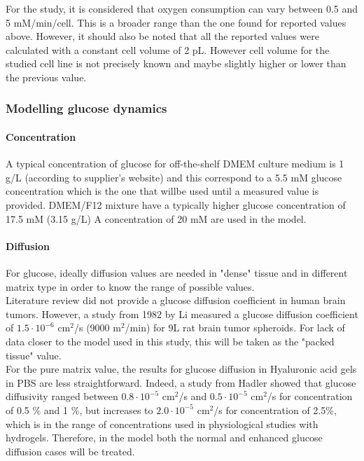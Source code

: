 \documentclass[11pt,a4paper]{article}
\begin{document}
For the study, it is considered that oxygen consumption can vary between 0.5 and 5 mM/min/cell. This is a broader range than the one found for reported values above. However, it should also be noted that all the reported values were calculated with a constant cell volume of 2 pL. However cell volume for the studied cell line is not precisely known and maybe slightly higher or lower than the previous value.\\

\subsubsection{Modelling glucose dynamics \label{glc}}

\paragraph{Concentration}
A typical concentration of glucose for off-the-shelf DMEM culture medium is 1 g/L (according to supplier’s website) and this correspond to a 5.5 mM glucose concentration which is the one that willbe used until a measured value is provided. DMEM/F12 mixture have a typically higher glucose concentration of 17.5 mM (3.15 g/L) A concentration of 20 mM are used in the model. 


\paragraph{Diffusion}
For glucose, ideally diffusion values are needed in "dense" tissue and in different matrix type in order to know the range of possible values.\\

Literature review did not provide a glucose diffusion coefficient in human brain tumors. However, a study from 1982 by Li measured a glucose diffusion coefficient of $1.5\cdot 10^{-6}$ cm$^2$/s (9000 \textmu m$^2$/min) for 9L rat brain tumor spheroids.\cite{Li1982} For lack of data closer to the model used in this study, this will be taken as the "packed tissue" value. \\

For the pure matrix value, the results for glucose diffusion in Hyaluronic acid gels in PBS are less straightforward. Indeed, a study from Hadler showed that glucose diffusivity ranged between $0.8\cdot 10^{-5}$ cm$^2$/s and $0.5\cdot 10^{-5}$ cm$^2$/s for concentration of 0.5 \% and 1 \%, but increases to $2.0\cdot 10^{-5}$ cm$^2$/s for concentration of 2.5\%, which is in the range of concentrations used in physiological studies with hydrogels.\cite{Gerecht2007} Therefore, in the model both the normal and enhanced glucose diffusion cases will be treated.\\
\end{document}
